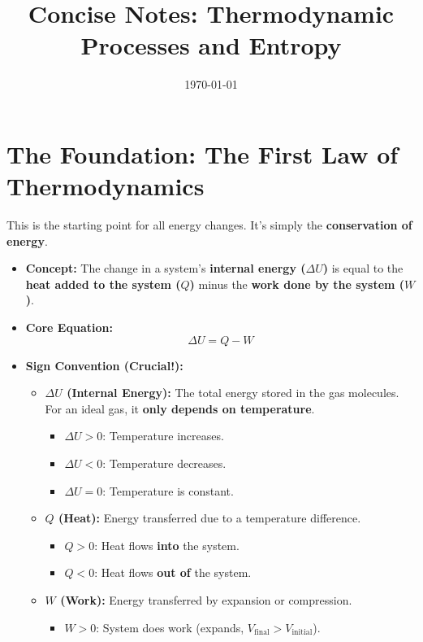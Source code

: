 \documentclass[article]{article}
\title{Concise Notes: Thermodynamic Processes and Entropy}
\date{\today}
\begin{document}
\maketitle

\section{The Foundation: The First Law of Thermodynamics}

This is the starting point for all energy changes. It's simply the \textbf{conservation of energy}.

\begin{itemize}
    \item \textbf{Concept:} The change in a system's \textbf{internal energy ($\Delta U$)} is equal to the \textbf{heat added to the system ($Q$)} minus the \textbf{work done by the system ($W$)}.
    \item \textbf{Core Equation:}
        $$ \Delta U = Q - W $$
    \item \textbf{Sign Convention (Crucial!):}
    \begin{itemize}
        \item \textbf{$\Delta U$ (Internal Energy):} The total energy stored in the gas molecules. For an ideal gas, it \textbf{only depends on temperature}.
            \begin{itemize}
                \item $\Delta U > 0$: Temperature increases.
                \item $\Delta U < 0$: Temperature decreases.
                \item $\Delta U = 0$: Temperature is constant.
            \end{itemize}
        \item \textbf{$Q$ (Heat):} Energy transferred due to a temperature difference.
            \begin{itemize}
                \item $Q > 0$: Heat flows \textbf{into} the system.
                \item $Q < 0$: Heat flows \textbf{out of} the system.
            \end{itemize}
        \item \textbf{$W$ (Work):} Energy transferred by expansion or compression.
            \begin{itemize}
                \item $W > 0$: System does work (expands, $V_{\text{final}} > V_{\text{initial}}$).

\end{itemize}
\end{itemize}
\end{itemize}
\end{document}
